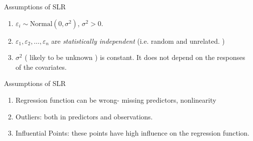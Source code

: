 \documentclass[compress]{beamer}
\begin{document}


\begin{frame}{Assumptions of SLR }



\begin{enumerate}
\item $\varepsilon_i\sim \text{Normal}(0, \sigma^2)$, $\sigma^2>0$.
\item $\varepsilon_1, \varepsilon_2, \ldots, \varepsilon_n$ are {\it statistically  independent} (i.e.  random and unrelated. )
\item $\sigma^2$  ( likely to be unknown ) is constant. It does not depend on the responses of the covariates. 
\end{enumerate}

\end{frame}





\begin{frame}{Assumptions of SLR }

\begin{enumerate}
\item Regression function can be wrong- missing predictors,
nonlinearity
\item Outliers: both in predictors and observations.
\item Influential Points: these points have high  influence on the
regression function.
\end{enumerate}



\end{frame}
\end{document}
